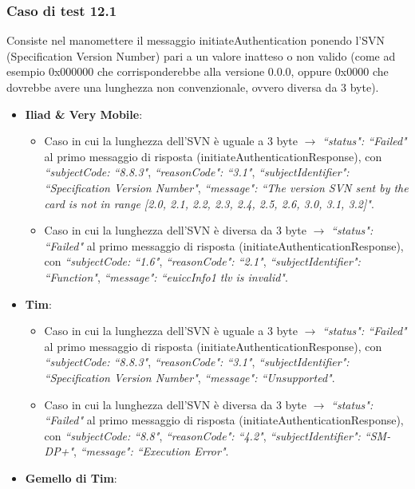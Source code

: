 \documentclass[10pt, oneside]{book}
\begin{document}
\subsubsection{Caso di test 12.1}
Consiste nel manomettere il messaggio initiateAuthentication ponendo l'SVN (Specification Version Number) pari a un valore inatteso o non valido (come ad esempio 0x000000 che corrisponderebbe alla versione 0.0.0, oppure 0x0000 che dovrebbe avere una lunghezza non convenzionale, ovvero diversa da 3 byte).
\begin{itemize}
\item \textbf{Iliad \& Very Mobile}:
\begin{itemize}
\item Caso in cui la lunghezza dell'SVN è uguale a 3 byte $\rightarrow$ \textit{``status": ``Failed"} al primo messaggio di risposta (initiateAuthenticationResponse), con \textit{``subjectCode: ``8.8.3"}, \textit{``reasonCode": ``3.1"}, \textit{``subjectIdentifier": ``Specification Version Number"}, \textit{``message": ``The version SVN sent by the card is not in range [2.0, 2.1, 2.2, 2.3, 2.4, 2.5, 2.6, 3.0, 3.1, 3.2]"}.
\item Caso in cui la lunghezza dell'SVN è diversa da 3 byte $\rightarrow$ \textit{``status": ``Failed"} al primo messaggio di risposta (initiateAuthenticationResponse), con \textit{``subjectCode: ``1.6"}, \textit{``reasonCode": ``2.1"}, \textit{``subjectIdentifier": ``Function"}, \textit{``message": ``euiccInfo1 tlv is invalid"}.
\end{itemize}
\item \textbf{Tim}:
\begin{itemize}
\item Caso in cui la lunghezza dell'SVN è uguale a 3 byte $\rightarrow$ \textit{``status": ``Failed"} al primo messaggio di risposta (initiateAuthenticationResponse), con \textit{``subjectCode: ``8.8.3"}, \textit{``reasonCode": ``3.1"}, \textit{``subjectIdentifier": ``Specification Version Number"}, \textit{``message": ``Unsupported"}.
\item Caso in cui la lunghezza dell'SVN è diversa da 3 byte $\rightarrow$ \textit{``status": ``Failed"} al primo messaggio di risposta (initiateAuthenticationResponse), con \textit{``subjectCode: ``8.8"}, \textit{``reasonCode": ``4.2"}, \textit{``subjectIdentifier": ``SM-DP+"}, \textit{``message": ``Execution Error"}.
\end{itemize}
\item \textbf{Gemello di Tim}:
\begin{itemize}

\end{itemize}
\end{itemize}
\end{document}

